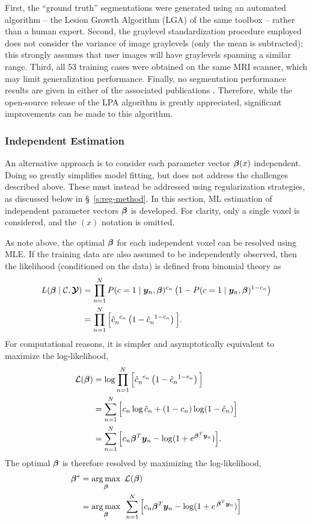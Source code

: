 First, the ``ground truth'' segmentations were generated using an automated algorithm -- the Lesion Growth Algorithm (LGA) \cite{Schmidt2012} of the same toolbox -- rather than a human expert.
Second, the graylevel standardization procedure employed does not consider the variance of image graylevels (only the mean is subtracted); this strongly assumes that user images will have graylevels spanning a similar range.
Third, all 53 training cases were obtained on the same MRI scanner, which may limit generalization performance.
Finally, no segmentation performance results are given in either of the associated publications \cite{Schmidt2017,Schmidt2017a}.
Therefore, while the open-source release of the LPA algorithm is greatly appreciated, significant improvements can be made to this algorithm.
\subsubsection{Independent Estimation}
An alternative approach is to consider each parameter vector $\bm{\beta}(x)$ independent. Doing so greatly simplifies model fitting, but does not address the challenges described above. These must instead be addressed using regularization strategies, as discussed below in \S\ \ref{s:reg-method}. In this section, ML estimation of independent parameter vectors $\bm{\beta}$ is developed. For clarity, only a single voxel is considered, and the $(x)$ notation is omitted.
\par
As note above, the optimal $\bm{\beta}$ for each independent voxel can be resolved using MLE. If the training data are also assumed to be independently observed, then the likelihood (conditioned on the data) is defined from binomial theory as
\begin{align}
  L(\bm{\beta}\mid\mathcal{C},\bm{\mathcal{Y}}) &= \prod_{n=1}^{N} P(c=1\mid\bm{y}_n,\bm{\beta})^{c_n} \left(1-P(c=1\mid\bm{y}_n,\bm{\beta})^{1-c_n}\right)\nonumber\\
  &= \prod_{n=1}^{N} \Big[\hat{c}_n^{\enspace c_n} \left(1-\hat{c}_n^{\enspace 1-c_n}\right)\Big].
  \label{eq:likelihood}
\end{align}
For computational reasons, it is simpler and asymptotically equivalent to maximize the log-likelihood,
\begin{align}
\mathcal{L}(\bm{\beta}) &= \log{ \prod_{n=1}^{N} \Big[\hat{c}_n^{\enspace c_n} \left(1-\hat{c}_n^{\enspace1-c_n}\right)\Big] }\nonumber\\
&= \sum_{n=1}^{N} \Big[ c_n \log \hat{c}_n + (1-c_n) \log (1-\hat{c}_n) \Big] \nonumber\\
&= \sum_{n=1}^{N} \Big[ c_n \bm{\beta}^T\bm{y}_n - \log (1+e^{\bm{\beta}^T\bm{y}_n}) \Big].
\label{eq:loglikelihood}
\end{align}
The optimal $\bm{\beta}$ is therefore resolved by maximizing the log-likelihood,
\begin{align}
\bm{\beta}^* &= \underset{\bm{\beta}}{\arg\max} \enspace\mathcal{L}(\bm{\beta})\nonumber\\
&= \underset{\bm{\beta}}{\arg\max}\enspace\sum_{n=1}^{N} \Big[ c_n \bm{\beta}^T\bm{y}_n - \log (1+e^{\thinspace\bm{\beta}^T\bm{y}_n}) \Big]
\label{eq:argmaxmle}
\end{align}
